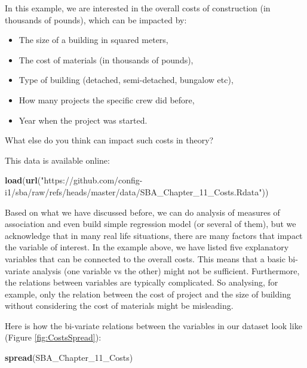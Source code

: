 \documentclass[
]{book}
\newenvironment{Shaded}{\begin{snugshade}}{\end{snugshade}}
\newcommand{\FunctionTok}[1]{\textcolor[rgb]{0.13,0.29,0.53}{\textbf{#1}}}
\newcommand{\NormalTok}[1]{#1}
\newcommand{\StringTok}[1]{\textcolor[rgb]{0.31,0.60,0.02}{#1}}
\providecommand{\tightlist}{%
  \setlength{\itemsep}{0pt}\setlength{\parskip}{0pt}}
\theoremstyle{definition}
\theoremstyle{definition}
\theoremstyle{definition}
\theoremstyle{definition}
\theoremstyle{remark}
\begin{document}
In this example, we are interested in the overall costs of construction (in thousands of pounds), which can be impacted by:

\begin{itemize}
\tightlist
\item
  The size of a building in squared meters,
\item
  The cost of materials (in thousands of pounds),
\item
  Type of building (detached, semi-detached, bungalow etc),
\item
  How many projects the specific crew did before,
\item
  Year when the project was started.
\end{itemize}

What else do you think can impact such costs in theory?

This data is available online:

\begin{Shaded}
\begin{Highlighting}[]
\FunctionTok{load}\NormalTok{(}\FunctionTok{url}\NormalTok{(}\StringTok{"https://github.com/config{-}i1/sba/raw/refs/heads/master/data/SBA\_Chapter\_11\_Costs.Rdata"}\NormalTok{))}
\end{Highlighting}
\end{Shaded}

Based on what we have discussed before, we can do analysis of measures of association and even build simple regression model (or several of them), but we acknowledge that in many real life situations, there are many factors that impact the variable of interest. In the example above, we have listed five explanatory variables that can be connected to the overall costs. This means that a basic bi-variate analysis (one variable vs the other) might not be sufficient. Furthermore, the relations between variables are typically complicated. So analysing, for example, only the relation between the cost of project and the size of building without considering the cost of materials might be misleading.

Here is how the bi-variate relations between the variables in our dataset look like (Figure \ref{fig:CostsSpread}):

\begin{Shaded}
\begin{Highlighting}[]
\FunctionTok{spread}\NormalTok{(SBA\_Chapter\_11\_Costs)}
\end{Highlighting}
\end{Shaded}
\end{document}
